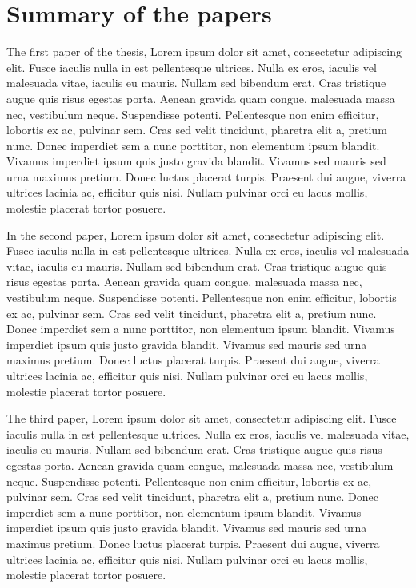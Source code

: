 


\chapter{Summary of the papers}

The first paper of the thesis, Lorem ipsum dolor sit amet, consectetur adipiscing elit. Fusce iaculis nulla in est pellentesque ultrices. Nulla ex eros, iaculis vel malesuada vitae, iaculis eu mauris. Nullam sed bibendum erat. Cras tristique augue quis risus egestas porta. Aenean gravida quam congue, malesuada massa nec, vestibulum neque. Suspendisse potenti. Pellentesque non enim efficitur, lobortis ex ac, pulvinar sem. Cras sed velit tincidunt, pharetra elit a, pretium nunc. Donec imperdiet sem a nunc porttitor, non elementum ipsum blandit. Vivamus imperdiet ipsum quis justo gravida blandit. Vivamus sed mauris sed urna maximus pretium. Donec luctus placerat turpis. Praesent dui augue, viverra ultrices lacinia ac, efficitur quis nisi. Nullam pulvinar orci eu lacus mollis, molestie placerat tortor posuere.


In the second paper, Lorem ipsum dolor sit amet, consectetur adipiscing elit. Fusce iaculis nulla in est pellentesque ultrices. Nulla ex eros, iaculis vel malesuada vitae, iaculis eu mauris. Nullam sed bibendum erat. Cras tristique augue quis risus egestas porta. Aenean gravida quam congue, malesuada massa nec, vestibulum neque. Suspendisse potenti. Pellentesque non enim efficitur, lobortis ex ac, pulvinar sem. Cras sed velit tincidunt, pharetra elit a, pretium nunc. Donec imperdiet sem a nunc porttitor, non elementum ipsum blandit. Vivamus imperdiet ipsum quis justo gravida blandit. Vivamus sed mauris sed urna maximus pretium. Donec luctus placerat turpis. Praesent dui augue, viverra ultrices lacinia ac, efficitur quis nisi. Nullam pulvinar orci eu lacus mollis, molestie placerat tortor posuere.


The third paper, Lorem ipsum dolor sit amet, consectetur adipiscing elit. Fusce iaculis nulla in est pellentesque ultrices. Nulla ex eros, iaculis vel malesuada vitae, iaculis eu mauris. Nullam sed bibendum erat. Cras tristique augue quis risus egestas porta. Aenean gravida quam congue, malesuada massa nec, vestibulum neque. Suspendisse potenti. Pellentesque non enim efficitur, lobortis ex ac, pulvinar sem. Cras sed velit tincidunt, pharetra elit a, pretium nunc. Donec imperdiet sem a nunc porttitor, non elementum ipsum blandit. Vivamus imperdiet ipsum quis justo gravida blandit. Vivamus sed mauris sed urna maximus pretium. Donec luctus placerat turpis. Praesent dui augue, viverra ultrices lacinia ac, efficitur quis nisi. Nullam pulvinar orci eu lacus mollis, molestie placerat tortor posuere.
